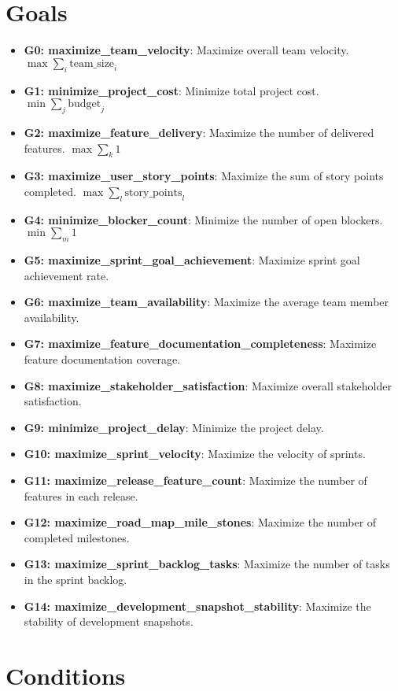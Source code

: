 \documentclass{article}
\begin{document}
\section{Goals}

\begin{itemize}
    \item \textbf{G0: maximize\_team\_velocity}: Maximize overall team velocity.  $\max \sum_{i} \text{team\_size}_i$
    \item \textbf{G1: minimize\_project\_cost}: Minimize total project cost. $\min \sum_{j} \text{budget}_j$
    \item \textbf{G2: maximize\_feature\_delivery}: Maximize the number of delivered features. $\max \sum_{k} 1$
    \item \textbf{G3: maximize\_user\_story\_points}: Maximize the sum of story points completed.  $\max \sum_{l} \text{story\_points}_l$
    \item \textbf{G4: minimize\_blocker\_count}: Minimize the number of open blockers. $\min \sum_{m} 1$
    \item \textbf{G5: maximize\_sprint\_goal\_achievement}: Maximize sprint goal achievement rate.
    \item \textbf{G6: maximize\_team\_availability}: Maximize the average team member availability.
    \item \textbf{G7: maximize\_feature\_documentation\_completeness}: Maximize feature documentation coverage.
    \item \textbf{G8: maximize\_stakeholder\_satisfaction}: Maximize overall stakeholder satisfaction.
    \item \textbf{G9: minimize\_project\_delay}: Minimize the project delay.
    \item \textbf{G10: maximize\_sprint\_velocity}: Maximize the velocity of sprints.
    \item \textbf{G11: maximize\_release\_feature\_count}: Maximize the number of features in each release.
    \item \textbf{G12: maximize\_road\_map\_mile\_stones}: Maximize the number of completed milestones.
    \item \textbf{G13: maximize\_sprint\_backlog\_tasks}: Maximize the number of tasks in the sprint backlog.
    \item \textbf{G14: maximize\_development\_snapshot\_stability}: Maximize the stability of development snapshots.
\end{itemize}

\section{Conditions}
\end{document}
